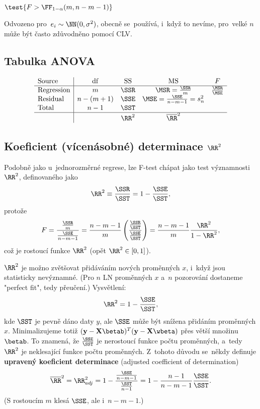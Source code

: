  $\test{F>\FF_{1-\alpha}(m,n-m-1)}$
 
 \begin{remark}
 	Odvozeno pro~$e_i\sim\NN(0,\sigma^2)$, obecně se~používá, i~když to nevíme, pro~velké $n$ může být často zdůvodněno pomocí CLV.
 \end{remark}
\subsection*{Tabulka ANOVA}
$$ \begin{array}{l|cccc}
\text{Source}& \mathrm{df} & \mathrm{SS} & \mathrm{MS} & F \\\hline
\text{Regression} & m & \SSR & \MSR=\frac{\SSR}{m} & \frac{\MSR}{\MSE} \\
\text{Residual} & n-(m+1) & \SSE & \MSE=\frac{\SSE}{n-m-1}=s_n^2 &  \\
\text{Total} & n-1 & \SST &  &  \\\hline
&  & \RR^2 & \overline{\RR}^2 & 
\end{array}
 $$
 \subsection*{Koeficient (vícenásobné) determinace $\RR^2$}
 Podobně jako u~jednorozměrné regrese, lze F-test chápat jako test významnosti $\RR^2$, definovaného jako
 $$ \RR^2\equiv \frac{\SSR}{\SST}=1-\frac{\SSE}{\SST},$$
 protože 
 $$ F=\frac{\frac{\SSR}{m}}{\frac{\SSE}{n-m-1}}=\frac{n-m-1}{m}\left( \frac{\frac{\SSR}{\SST}}{\frac{\SSE}{\SST}} \right)=\frac{n-m-1}{m}\frac{\RR^2}{1-\RR^2},$$
 což je rostoucí funkce $\RR^2$ (opět $\RR^2\in[0,1]$).
 \begin{remark}
 	$\RR^2$ je možno zvětšovat přidáváním nových proměnných $x$, i~když jsou statisticky nevýznamné. (Pro $n$ LN proměnných $x$ a~$n$ pozorování dostaneme "perfect fit", tedy přeučení.) Vysvětlení:
 	$$ \RR^2=1-\frac{\SSE}{\SST},$$
 	kde $\SST$ je pevně dáno daty $y$, ale $\SSE$ může být snížena přidáním proměnných $x$. Minimalizujeme totiž $(\textbf{y}-\textbf{X}\betab)^T(\textbf{y}-\textbf{X}\wbeta)$ přes větší množinu $\betab$. To znamená, že $\frac{\SSE}{\SST}$ je nerostoucí funkce počtu proměnných, a~tedy $\RR^2$ je neklesající funkce počtu proměnných. Z~tohoto důvodu se~někdy definuje \textbf{upravený koeficient determinace} (adjusted coefficient of determination)
 	$$ \overline{\RR}^2=\RR_{adj}^2=1-\frac{\frac{\SSE}{n-m-1}}{\frac{\SST}{n-1}}=1-\frac{n-1}{n-m-1}\frac{\SSE}{\SST}.$$
 	(S rostoucím $m$ klesá $\SSE$, ale i~$n-m-1$.)
 \end{remark}
